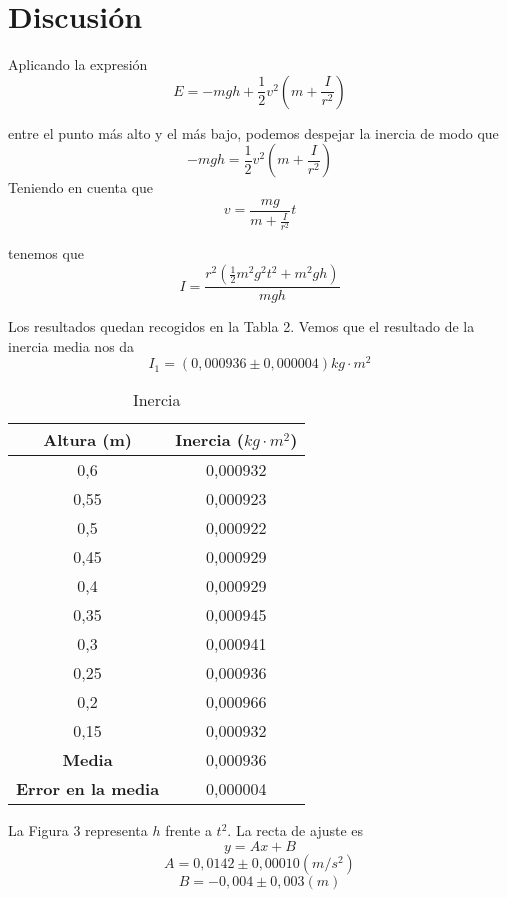 \documentclass[a4paper,12pt,spanish]{article}
\begin{document}
	
	\section{Discusión}
	
	Aplicando la expresión
	\[E = -mgh + \frac{1}{2}v^2(m+\frac{I}{r^2})\]
	
	entre el punto más alto y el más bajo, podemos despejar la inercia de modo que 
	\[  -mgh = \frac{1}{2}v^2(m+\frac{I}{r^2})
	\]
	Teniendo en cuenta que 
	\[v= \frac{mg}{m+\frac{I}{r^2}}t\]
	
	tenemos que 
	\[ I = \frac{r^2(\frac{1}{2} m^2g^2t^2 + m^2gh)}{mgh}\]
	
	Los resultados quedan recogidos en la Tabla 2.
	Vemos que el resultado de la inercia media nos da
	\[ \boxed{I_{1} = (0,000936 \pm 0,000004) \si{kg \cdot m^2}}\]
	
	\begin{table}[H]
		\centering
		\begin{tabular}{|c|c|}
			\hline
			\textbf{Altura (m)} & \textbf{Inercia ($\si{kg \cdot m^2}$)} \\ \hline
			0,6                 & 0,000932         \\ \hline
			0,55                & 0,000923         \\ \hline
			0,5                 & 0,000922         \\ \hline
			0,45                & 0,000929         \\ \hline
			0,4                 & 0,000929         \\ \hline
			0,35                & 0,000945         \\ \hline
			0,3                 & 0,000941         \\ \hline
			0,25                & 0,000936         \\ \hline
			0,2                 & 0,000966         \\ \hline
			0,15                & 0,000932         \\ \hline\hline
		\textbf{	Media }              & 0,000936         \\ \hline
			\textbf{Error en la media}   & 0,000004         \\ \hline
		\end{tabular}
	\caption{Inercia}
	\end{table}
	
	La Figura 3 representa $h$ frente a $t^2$. La recta de ajuste es
	\[ y = Ax + B  \]
	\[A = 0,0142 \pm 0,00010(\si{m/s^2}) \]
	\[B = -0,004 \pm 0,003 (\si{m})\] 
\end{document}
